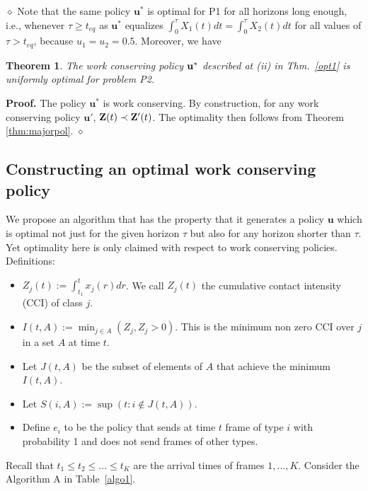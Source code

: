 \documentclass[10pt,twocolumn,conference,final]{IEEEtran}
\def\endpf{\hfill$\diamond$}
\newtheorem{thm}{Theorem}[section]
\newcommand{\ubf}{\mathbf u}
\begin{document}
\endpf
Note that the same policy $\ubf^*$ is optimal for P1
for all horizons long enough,
i.e., whenever $\tau \geq t_{eq}$ as $\ubf^*$ equalizes
$ \int_0^\tau X_1(t) dt = \int_0^\tau X_2(t) dt $ for all values of
$\tau>t_{eq}$, because $u_1=u_2=0.5$. Moreover, we have
\\
\begin{thm}\label{befteq}
The work conserving policy ${\bf u}^*$ described at (ii) in Thm.~\ref{opt1}
is uniformly optimal for problem P2.
\end{thm}
\bigskip
{\bf Proof.} The policy $\ubf^*$ is work conserving.
By construction, for any work conserving policy $\ubf'$,
${\bf Z} (t) \prec {\bf Z'} (t) $. The optimality then
follows from Theorem \ref{thm:majorpol}.
\endpf
\subsection{Constructing an optimal work conserving policy}
We propose an algorithm that has the property that it generates
a policy $\mathbf u$ which is optimal not just for the given horizon
$\tau$ but also for any horizon shorter than $\tau$. Yet
optimality here is only claimed with respect to work conserving policies.
Definitions:
\begin{itemize}
\item
$ Z_j (t):= \int_{t_1}^t x_j (r) dr $.
We call $Z_j(t)$ the cumulative contact intensity (CCI) of class $j$.
\item
$ I(t,A):= \min_{j \in A }(Z_j, Z_j > 0) $.
This is the  minimum non zero CCI over $j$ in a set $A$ at time $t$.
\item
Let $J(t,A)$ be the subset of elements of $A$ that achieve the minimum $I(t,A)$.
\item
Let $S(i,A):=\sup( t: i \notin J(t,A))$.
\item
Define $ e_i$ to be the policy that sends at time $t$ frame of type $i$
with probability 1 and does not send frames of other types.
\end{itemize}
Recall that $t_1 \leq t_2 \leq ... \leq t_K$ are the arrival
times of frames $1,...,K$.
Consider the Algorithm A in Table~\ref{algo1}.
\end{document}

